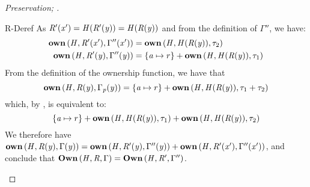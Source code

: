 \begin{proof}[Preservation; ]
\begin{rneqncase}{R-Deref}
    As $\mathit{R'}  (  \mathit{x'}  )  =  \mathit{H}  (  \mathit{R'}  (  \mathit{y}  )  )  =  \mathit{H}  (  \mathit{R}  (  \mathit{y}  )  )$ and from the definition of $\Gamma''$, we have:
    \begin{align*}
       \mathbf{own} \, (  \mathit{H}  ,  \mathit{R'}  (  \mathit{x'}  )  ,  \Gamma''  (  \mathit{x'}  )  )  & =  \mathbf{own} \, (  \mathit{H}  ,  \mathit{H}  (  \mathit{R}  (  \mathit{y}  )  )  ,  \tau_{{\mathrm{2}}}  )  \\
       \mathbf{own} \, (  \mathit{H}  ,  \mathit{R'}  (  \mathit{y}  )  ,  \Gamma''  (  \mathit{y}  )  )  & =  \{  \mathit{a}  \mapsto  r  \}  +  \mathbf{own} \, (  \mathit{H}  ,  \mathit{H}  (  \mathit{R}  (  \mathit{y}  )  )  ,  \tau_{{\mathrm{1}}}  ) 
    \end{align*}
    From the definition of the ownership function, we have that
    \[
      \mathbf{own} \, (  \mathit{H}  ,  \mathit{R}  (  \mathit{y}  )  ,  \Gamma_{\mathit{p}}  (  \mathit{y}  )  )  =  \{  \mathit{a}  \mapsto  r  \}  +  \mathbf{own} \, (  \mathit{H}  ,  \mathit{H}  (  \mathit{R}  (  \mathit{y}  )  )  ,  \tau_{{\mathrm{1}}}  +  \tau_{{\mathrm{2}}}  )
    \]
    which, by , is equivalent to:
    \[
      \{  \mathit{a}  \mapsto  r  \}  +  \mathbf{own} \, (  \mathit{H}  ,  \mathit{H}  (  \mathit{R}  (  \mathit{y}  )  )  ,  \tau_{{\mathrm{1}}}  )  +  \mathbf{own} \, (  \mathit{H}  ,  \mathit{H}  (  \mathit{R}  (  \mathit{y}  )  )  ,  \tau_{{\mathrm{2}}}  )
    \]
    We therefore have $\mathbf{own} \, (  \mathit{H}  ,  \mathit{R}  (  \mathit{y}  )  ,  \Gamma  (  \mathit{y}  )  )  =  \mathbf{own} \, (  \mathit{H}  ,  \mathit{R'}  (  \mathit{y}  )  ,  \Gamma''  (  \mathit{y}  )  )  +  \mathbf{own} \, (  \mathit{H}  ,  \mathit{R'}  (  \mathit{x'}  )  ,  \Gamma''  (  \mathit{x'}  )  )$, and conclude that $\mathbf{Own} \, (  \mathit{H}  ,  \mathit{R}  ,  \Gamma  )  =  \mathbf{Own} \, (  \mathit{H}  ,  \mathit{R'}  ,  \Gamma''  )$.
  \end{rneqncase} %


\end{proof}
